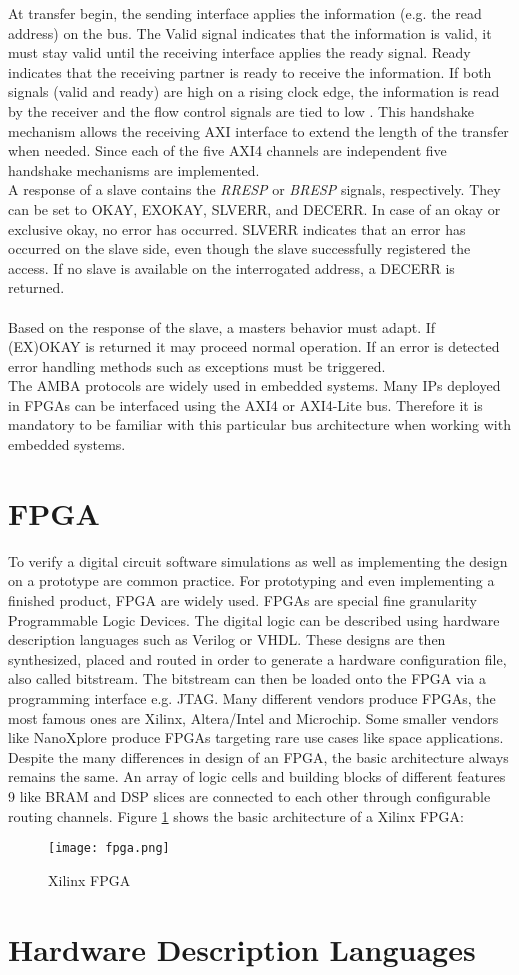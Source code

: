At transfer begin, the sending interface applies the information (e.g. the read address) on the bus. The Valid signal indicates that the information is valid, it must stay valid until the receiving interface applies the ready signal. Ready indicates that the receiving partner is ready to receive the information. If both signals (valid and ready) are high on a rising clock edge, the information is read by the receiver and the flow control signals are tied to low \cite{AMBA:AXI}. This handshake mechanism allows the receiving \ac{AXI} interface to extend the length of the transfer when needed. Since each of the five \ac{AXI}4 channels are independent five handshake mechanisms are implemented.\\
A response of a slave contains the \textit{RRESP} or \textit{BRESP} signals, respectively. They can be set to OKAY, EXOKAY, SLVERR, and DECERR. In case of an okay or exclusive okay, no error has occurred. SLVERR indicates that an error has occurred on the slave side, even though the slave successfully registered the access. If no slave is available on the interrogated address, a DECERR is returned.\\\\
Based on the response of the slave, a masters behavior must adapt. If (EX)OKAY is returned it may proceed normal operation. If an error is detected error handling methods such as exceptions must be triggered. \\
The \ac{AMBA} protocols are widely used in embedded systems. Many \acp{IP} deployed in \acp{FPGA} can be interfaced using the \ac{AXI}4 or \ac{AXI4-Lite} bus. Therefore it is mandatory to be familiar with this particular bus architecture when working with embedded systems.




\section{FPGA}
To verify a digital circuit software simulations as well as implementing the design on
a prototype are common practice. For prototyping and even implementing a finished
product, FPGA are widely used.
FPGAs are special fine granularity Programmable Logic Devices. The digital logic
can be described using hardware description languages such as Verilog or VHDL.
These designs are then synthesized, placed and routed in order to generate a
hardware configuration file, also called bitstream. The bitstream can then be loaded
onto the FPGA via a programming interface e.g. JTAG.
Many different vendors produce FPGAs, the most famous ones are Xilinx,
Altera/Intel and Microchip. Some smaller vendors like NanoXplore produce FPGAs
targeting rare use cases like space applications.
Despite the many differences in design of an FPGA, the basic architecture always
remains the same. An array of logic cells and building blocks of different features
9 like BRAM and DSP slices are connected to each other through configurable routing
channels.
Figure \ref{fig:FPGA} shows the basic architecture of a Xilinx FPGA:\\

\begin{figure}[h]
\centering
\texttt{[image: fpga.png]}
\caption{Xilinx FPGA \cite{xilinx:2017}}
\label{fig:FPGA}
\end{figure}
\section{Hardware Description Languages}



